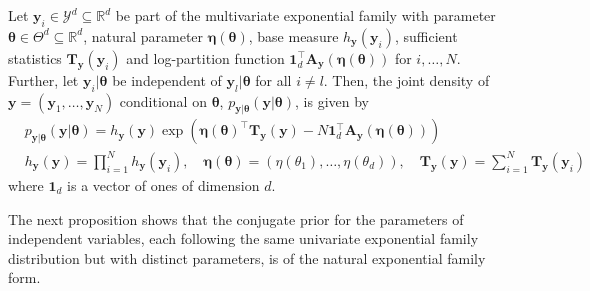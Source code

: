 \begin{proposition}
\label{prop:expfam_form_independent_multivariate_variables}
    Let $\boldsymbol{y}_i \in \mathcal{Y}^d \subseteq \mathbb{R}^d$ be part of the multivariate exponential family with parameter $\boldsymbol{\theta} \in \Theta^d \subseteq \mathbb{R}^d$, natural parameter $\boldsymbol{\eta}(\boldsymbol{\theta})$, base measure $h_{\boldsymbol{y}}(\boldsymbol{y}_i)$, sufficient statistics $\mathbf{T}_{\boldsymbol{y}}(\boldsymbol{y}_i)$ and log-partition function $\mathbf{1}_d^\top \mathbf{A}_{\boldsymbol{y}}(\boldsymbol{\eta}(\boldsymbol{\theta}))$ for $i, \dots, N$. Further, let $\boldsymbol{y}_i|\boldsymbol{\theta}$ be independent of $\boldsymbol{y}_l|\boldsymbol{\theta}$ for all $i \neq l$. Then, the joint density of $\mathbf{y} = (\boldsymbol{y}_1, \ldots, \boldsymbol{y}_N)$ conditional on $\boldsymbol{\theta}$, $p_{\mathbf{y}\vert\boldsymbol{\theta}}(\mathbf{y} \vert \boldsymbol{\theta})$, is given by 
    \begin{equation*}
        \begin{aligned}
    &p_{\mathbf{y}\vert\boldsymbol{\theta}}(\mathbf{y} \vert \boldsymbol{\theta}) = h_{\mathbf{y}}(\mathbf{y})   \exp \left( \boldsymbol{\eta}(\boldsymbol{\theta})^{\top} \mathbf{T}_{\mathbf{y}}(\mathbf{y}) - N \mathbf{1}_d^\top \mathbf{A}_{\boldsymbol{y}}(\boldsymbol{\eta}(\boldsymbol{\theta})) \right)\\
        &h_{\mathbf{y}}(\mathbf{y}) = \prod_{i = 1}^N h_{\boldsymbol{y}}(\boldsymbol{y}_i),\quad
        \boldsymbol{\eta}(\boldsymbol{\theta}) = (\eta(\theta_1), \dots, \eta(\theta_d)), \quad
        \mathbf{T}_{\mathbf{y}}(\mathbf{y}) = \sum_{i=1}^N \mathbf{T}_{\boldsymbol{y}}(\boldsymbol{y}_i) 
            \end{aligned}
    \end{equation*}
    where $\mathbf{1}_d$ is a vector of ones of dimension $d$.
\end{proposition}
The next proposition shows that the conjugate prior for the parameters of independent variables, each following the same univariate exponential family distribution but with distinct parameters, is of the natural exponential family form.
